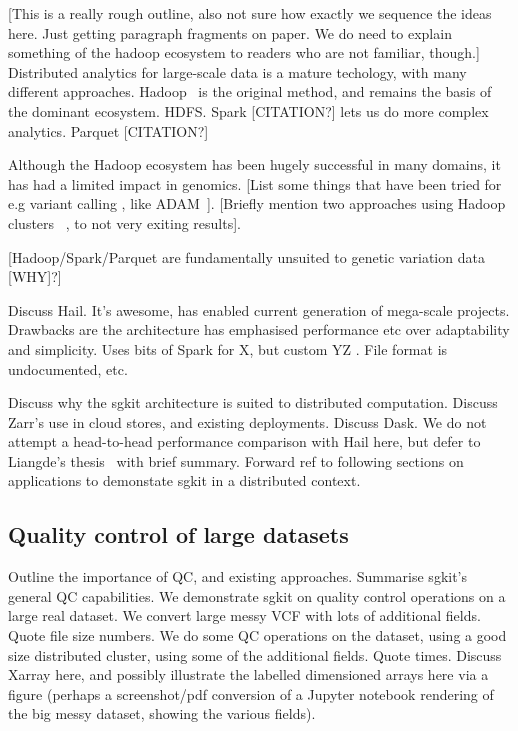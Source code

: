 \documentclass[a4paper,num-refs]{oup-contemporary}
\begin{document}
[This is a really rough outline, also not sure how exactly
we sequence the ideas here. Just getting paragraph fragments
on paper. We do need to explain something of the hadoop ecosystem
to readers who are not familiar, though.]
Distributed analytics for large-scale data is a mature
techology, with many different approaches. Hadoop~\citep{white2012hadoop}
is the original method, and remains the basis of the
dominant ecosystem. HDFS. Spark [CITATION?] lets us
do more complex analytics. Parquet [CITATION?]

Although the Hadoop ecosystem has been hugely successful
in many domains, it has had a limited impact in genomics.
[List some things that have been tried for e.g variant calling
, like ADAM~\citep{nothaft2015rethinking}].
[Briefly mention two approaches using Hadoop clusters
~\citep{boufea2017managing,fan2020variant}, to not very
exiting results].

[Hadoop/Spark/Parquet are fundamentally unsuited to genetic
variation data [WHY]?]

Discuss Hail. It's awesome, has enabled current
generation of mega-scale projects. Drawbacks are the
architecture has emphasised performance etc over adaptability
and simplicity. Uses bits of Spark for X, but custom YZ .
File format is undocumented, etc.

Discuss why the sgkit architecture is suited to distributed
computation. Discuss Zarr's use in cloud stores, and existing
deployments. Discuss Dask.
We do not attempt a head-to-head performance comparison with
Hail here, but defer to Liangde's thesis~\citep{li2022efficient}
with brief summary.
Forward ref to following sections on applications to demonstate
sgkit in a distributed context.

\subsection{Quality control of large datasets}
Outline the importance of QC, and existing approaches.
Summarise sgkit's general QC capabilities.
We demonstrate sgkit on quality control operations on a large
real dataset. We convert large messy VCF with lots of additional
fields. Quote file size numbers. We do some QC operations on
the dataset, using a good size distributed cluster, using
some of the additional fields. Quote times. Discuss Xarray
here, and possibly illustrate the labelled dimensioned arrays
here via a figure (perhaps a screenshot/pdf conversion of
a Jupyter notebook rendering of the big messy dataset,
showing the various fields).
\end{document}
